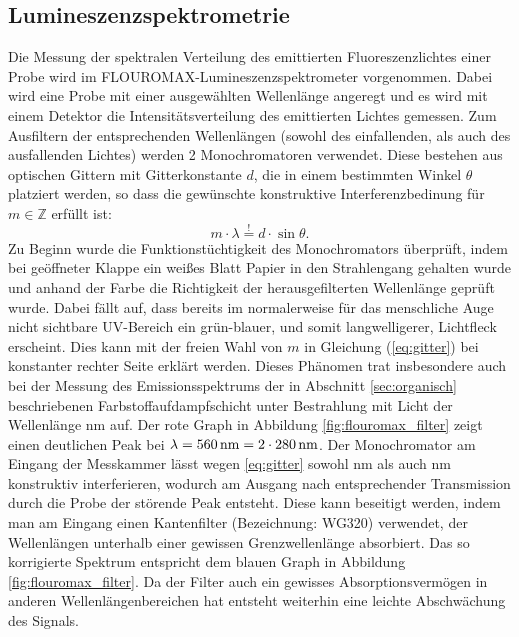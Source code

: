 	\subsection{Lumineszenzspektrometrie} \label{sec:fluoromax}
	Die Messung der spektralen Verteilung des emittierten Fluoreszenzlichtes einer Probe wird im FLOUROMAX-Lumineszenzspektrometer vorgenommen. Dabei wird eine Probe mit einer ausgewählten Wellenlänge angeregt und es wird mit einem Detektor die Intensitätsverteilung des emittierten Lichtes gemessen. Zum Ausfiltern der entsprechenden Wellenlängen (sowohl des einfallenden, als auch des ausfallenden Lichtes) werden 2 Monochromatoren verwendet. Diese bestehen aus optischen Gittern mit Gitterkonstante $d$, die in einem bestimmten Winkel $\theta$ platziert werden, so dass die gewünschte konstruktive Interferenzbedinung für $m \in \mathbb{Z}$ erfüllt ist:
	\begin{equation} \label{eq:gitter}
		m \cdot \lambda \overset{!}{=} d \cdot \sin\theta.
	\end{equation}
	Zu Beginn wurde die Funktionstüchtigkeit des Monochromators überprüft, indem bei geöffneter Klappe ein weißes Blatt Papier in den Strahlengang gehalten wurde und anhand der Farbe die Richtigkeit der herausgefilterten Wellenlänge geprüft wurde. Dabei fällt auf, dass bereits im normalerweise für das menschliche Auge nicht sichtbare UV-Bereich ein grün-blauer, und somit langwelligerer, Lichtfleck erscheint. Dies kann mit der freien Wahl von $m$ in Gleichung (\ref{eq:gitter}) bei konstanter rechter Seite erklärt werden. Dieses Phänomen trat insbesondere auch bei der Messung des Emissionsspektrums der in Abschnitt \ref{sec:organisch} beschriebenen Farbstoffaufdampfschicht unter Bestrahlung mit Licht der Wellenlänge \unit[280]{nm} auf. Der rote Graph in Abbildung \ref{fig:flouromax_filter} zeigt einen deutlichen Peak bei $\lambda = \unit[560]{nm} = 2\cdot \unit[280]{nm}$. Der Monochromator am Eingang der Messkammer lässt wegen \eqref{eq:gitter} sowohl \unit[280]{nm} als auch \unit[560]{nm} konstruktiv interferieren, wodurch am Ausgang nach entsprechender Transmission durch die Probe der störende Peak entsteht. Diese kann beseitigt werden, indem man am Eingang einen Kantenfilter (Bezeichnung: WG320) verwendet, der Wellenlängen unterhalb einer gewissen Grenzwellenlänge absorbiert. Das so korrigierte Spektrum entspricht dem blauen Graph in Abbildung \ref{fig:flouromax_filter}. Da der Filter auch ein gewisses Absorptionsvermögen in anderen Wellenlängenbereichen hat entsteht weiterhin eine leichte Abschwächung des Signals.
